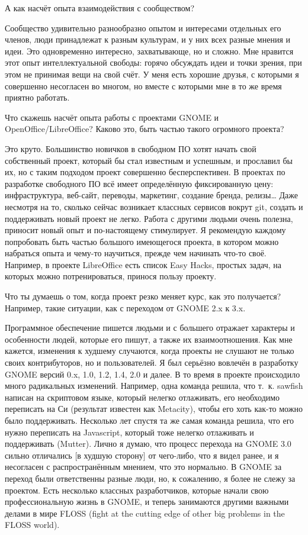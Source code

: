\documentclass[10pt, a5paper]{article}
\begin{document}
\begin{Parallel}[p]{}{}
{\q А как насчёт опыта взаимодействия с сообществом?

\a Сообщество удивительно разнообразно опытом и интересами отдельных его членов, люди принадлежат к разным культурам, и у них всех разные мнения и идеи. Это одновременно интересно, захватывающе, но и сложно. Мне нравится этот опыт интеллектуальной свободы: горячо обсуждать идеи и точки зрения, при этом не принимая вещи на свой счёт. У меня есть хорошие друзья, с которыми я совершенно несогласен во многом, но вместе с которыми мне в то же время приятно работать.

\q Что скажешь насчёт опыта работы с проектами GNOME и OpenOffice/LibreOffice? Каково это, быть частью такого огромного проекта?

\a Это круто. Большинство новичков в свободном ПО хотят начать свой собственный проект, который бы стал известным и успешным, и прославил бы их, но с таким подходом проект совершенно бесперспективен. В проектах по разработке свободного ПО всё имеет определённую фиксированную цену: инфраструктура, веб-сайт, переводы, маркетинг, создание бренда, релизы… Даже несмотря на то, сколько сейчас возникает классных сервисов вокрут git, создать и поддерживать новый проект не легко. Работа с другими людьми очень полезна, приносит новый опыт и по-настоящему стимулирует. Я рекомендую каждому попробовать быть частью большого имеющегося проекта, в котором можно набраться опыта и чему-то научиться, прежде чем начинать что-то своё. Например, в проекте LibreOffice есть список Easy Hacks, простых задач, на которых можно потренироваться, принося пользу проекту.

\q Что ты думаешь о том, когда проект резко меняет курс, как это получается? Например, такие ситуации, как с переходом от GNOME 2.x к 3.x.

\a Программное обеспечение пишется людьми и с большего отражает характеры и особенности людей, которые его пишут, а также их взаимоотношения. Как мне кажется, изменения к худшему случаются, когда проекты не слушают не только своих контрибуторов, но и пользователей. Я был серьёзно вовлечён в разработку GNOME версий 0.x, 1.0, 1.2, 1.4, 2.0 и далее. В то время в проекте происходило много радикальных изменений. Например, одна команда решила, что т.~к. sawfish написан на скриптовом языке, который нелегко отлаживать, его необходимо переписать на Си (результат известен как Metacity), чтобы его хоть как-то можно было поддерживать. Несколько лет спустя та же самая команда решила, что его нужно переписать на Javascript, который тоже нелегко отлаживать и поддерживать (Mutter). Лично я думаю, что процесс перехода на GNOME 3.0 сильно отличались [в худшую сторону] от чего-либо, что я видел ранее, и я несогласен с распространённым мнением, что это нормально. В GNOME за переход были ответственны разные люди, но, к сожалению, я более не слежу за проектом. Есть несколько классных разработчиков, которые начали свою профессиональную жизнь в GNOME, {\color{red} и теперь занимаются другими важными делами в мире FLOSS (fight at the cutting edge of other big problems in the FLOSS world).}

}
\end{Parallel}
\end{document}
